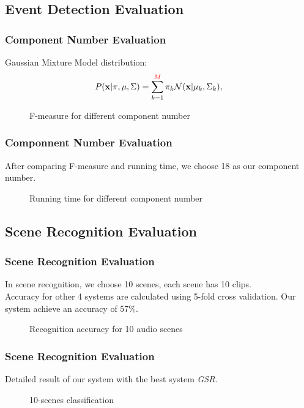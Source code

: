 \documentclass[xcolor=table,slidestop,compress,mathserif]{beamer}
\begin{document}
\subsection{Event Detection Evaluation}
\begin{frame}
	\frametitle{Component Number Evaluation}
	Gaussian Mixture Model distribution: \\ 
	\begin{equation}
	P(\mathbf{x}|\mathbf{\pi},\mathbf{\mu},\Sigma) = \sum_{k = 1}^{\textcolor{red}{M}} \pi_k
	\mathcal{N}(\mathbf{x}|\mathbf{\mu}_k, \Sigma_k),
	\end{equation} 

	\begin{figure}[htb!]
	\centering
	\resizebox{0.75\totalheight}{!}{}
	\caption{F-measure for different component number}
	\label{fig:component}
	\end{figure}
\end{frame}
\begin{frame}
	\frametitle{Componnent Number Evaluation}
	After comparing F-measure and running time, we choose 18 as our component number. 
	\begin{figure}[htb!]
	\centering
	\resizebox{0.8\totalheight}{!}{}
	\caption{Running time for different component number}
	\label{fig:component}
	\end{figure}
\end{frame}
\subsection{Scene Recognition Evaluation}
\begin{frame}
	\frametitle{Scene Recognition Evaluation}
	In scene recognition, we choose 10 scenes, each scene has 10 clips. \\ 	
	Accuracy for other 4 systems are calculated using 5-fold cross validation. 
	Our system achieve an accuracy of 57\%.
	\begin{figure}[htb!]
	\centering
	\resizebox{0.8\totalheight}{!}{}
	\caption{Recognition accuracy for 10 audio scenes}
	\label{fig:sceneeval}
	\end{figure}
\end{frame}
\begin{frame}
	\frametitle{Scene Recognition Evaluation}
	Detailed result of our system with the best system \textit{GSR}. \\ 
	\begin{figure}[htb!]
	\centering
	\resizebox{0.9\totalheight}{!}{}
	\caption{10-scenes classification}
	\label{fig:sceneeval}
	\end{figure}
\end{frame}
\end{document}
